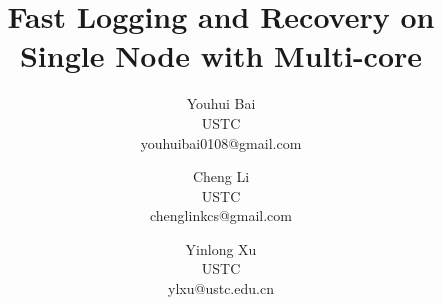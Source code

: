 \documentclass[letterpaper,twocolumn,10pt]{article}
\begin{document}
\date{}

\title{\Large \bf Fast Logging and Recovery on Single Node with Multi-core}

\author{
{\rm Youhui Bai}\\
USTC\\
youhuibai0108@gmail.com
\and
{\rm Cheng Li}\\
USTC\\
chenglinkcs@gmail.com
\and
{\rm Yinlong Xu}\\
USTC\\
ylxu@ustc.edu.cn
}

\maketitle

\thispagestyle{empty}
% 







\begin{footnotesize}
%


\end{footnotesize}
\end{document}
